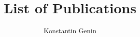 \documentclass[11pt]{amsart}
\title{List of Publications}
\author{Konstantin Genin}
\begin{document}
\maketitle

\nocite{*}


\end{document}
